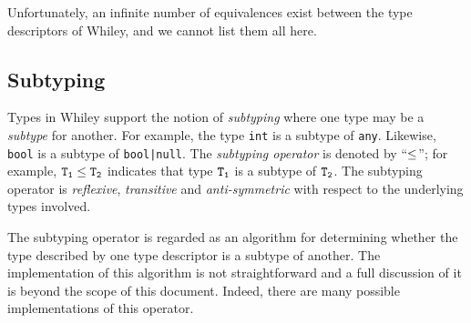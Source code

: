 


Unfortunately, an infinite number of equivalences exist between the type descriptors of Whiley, and we cannot list them all here.

\subsection{Subtyping}
\label{c_types_subtyping}
Types in Whiley support the notion of {\em subtyping} where one type may be a {\em subtype} for another.  For example, the type \lstinline{int} is a subtype of \lstinline{any}.  Likewise, \lstinline{bool} is a subtype of \lstinline{bool|null}.  The {\em subtyping operator} is denoted by ``${\tt \le}$''; for example, ${\tt T_1\le T_2}$ indicates that type ${\tt T_1}$ is a subtype of ${\tt T_2}$.  The subtyping operator is {\em reflexive}, {\em transitive} and {\em anti-symmetric} with respect to the underlying types involved. 

The subtyping operator is regarded as an algorithm for determining whether the type described by one type descriptor is a subtype of another.  The implementation of this algorithm is not straightforward and a full discussion of it is beyond the scope of this document.  Indeed, there are many possible implementations of this operator.  



